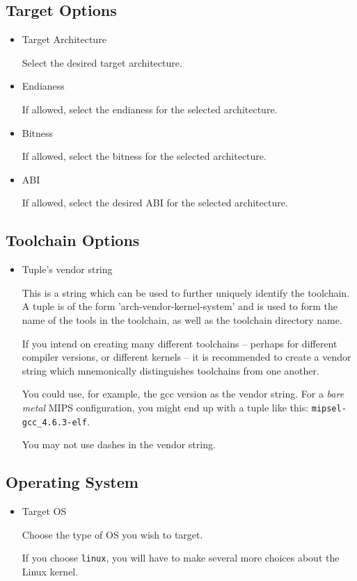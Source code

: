 \subsection{Target Options}
\begin{itemize}
\item{Target Architecture}

  Select the desired target architecture.

\item{Endianess}

  If allowed, select the endianess for the selected architecture.

\item{Bitness}

  If allowed, select the bitness for the selected architecture.

\item{ABI}

  If allowed, select the desired ABI for the selected architecture.

\end{itemize}

\subsection{Toolchain Options}
\begin{itemize}
\item{Tuple's vendor string}

  This is a string which can be used to further uniquely identify the
  toolchain.  A tuple is of the form 'arch-vendor-kernel-system' and
  is used to form the name of the tools in the toolchain, as well as
  the toolchain directory name.

  If you intend on creating many different toolchains -- perhaps for
  different compiler versions, or different kernels -- it is
  recommended to create a vendor string which mnemonically
  distinguishes toolchains from one another.

  You could use, for example, the gcc version as the vendor string.
  For a \emph{bare metal} MIPS configuration, you might end up with a
  tuple like this: \texttt{mipsel-gcc\_4.6.3-elf}.

  You may not use dashes in the vendor string.

\end{itemize}

\subsection{Operating System}
\begin{itemize}
\item{Target OS}

Choose the type of OS you wish to target.

If you choose \texttt{linux}, you will have to make several more
choices about the Linux kernel.
\end{itemize}

